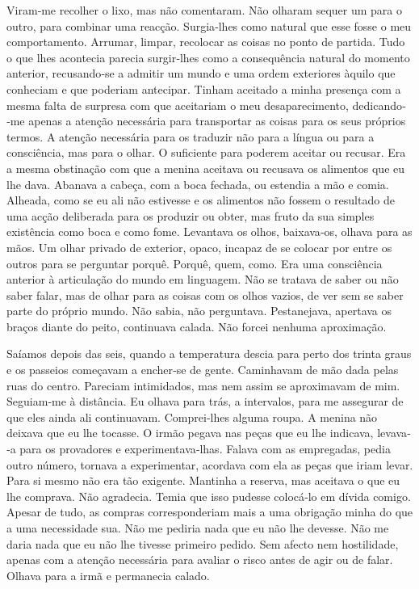 Viram­‑me recolher o lixo, mas não comentaram. Não olharam sequer um
para o outro, para combinar uma reacção. Surgia­‑lhes como natural que
esse fosse o meu comportamento. Arrumar, limpar, recolocar as coisas no
ponto de partida. Tudo o que lhes acontecia parecia surgir­‑lhes como a
consequência natural do momento anterior, recusando­‑se a admitir um
mundo e uma ordem exteriores àquilo que conheciam e que poderiam
antecipar. Tinham aceitado a minha presença com a mesma falta de
surpresa com que aceitariam o meu desaparecimento, dedicando­‑me apenas
a atenção necessária para transportar as coisas para os seus próprios
termos. A atenção necessária para os traduzir não para a língua ou para
a consciência, mas para o olhar. O suficiente para poderem aceitar ou
recusar. Era a mesma obstinação com que a menina aceitava ou recusava os
alimentos que eu lhe dava. Abanava a cabeça, com a boca fechada, ou
estendia a mão e comia. Alheada, como se eu ali não estivesse e os
alimentos não fossem o resultado de uma acção deliberada para os
produzir ou obter, mas fruto da sua simples existência como boca e como
fome. Levantava os olhos, baixava­‑os, olhava para as mãos. Um olhar
privado de exterior, opaco, incapaz de se colocar por entre os outros
para se perguntar porquê. Porquê, quem, como. Era uma consciência
anterior à articulação do mundo em linguagem. Não se tratava de saber ou
não saber falar, mas de olhar para as coisas com os olhos vazios, de ver
sem se saber parte do próprio mundo. Não sabia, não perguntava.
Pestanejava, apertava os braços diante do peito, continuava calada. Não
forcei nenhuma aproximação.

Saíamos depois das seis, quando a temperatura descia para perto dos
trinta graus e os passeios começavam a encher­‑se de gente. Caminhavam
de mão dada pelas ruas do centro. Pareciam intimidados, mas nem assim se
aproximavam de mim. Seguiam­‑me à distância. Eu olhava para trás, a
intervalos, para me assegurar de que eles ainda ali continuavam.
Comprei­‑lhes alguma roupa. A menina não deixava que eu lhe tocasse. O
irmão pegava nas peças que eu lhe indicava, levava­‑a para os provadores
e experimentava­‑lhas. Falava com as empregadas, pedia outro número,
tornava a experimentar, acordava com ela as peças que iriam levar. Para
si mesmo não era tão exigente. Mantinha a reserva, mas aceitava o que eu
lhe comprava. Não agradecia. Temia que isso pudesse colocá­‑lo em dívida
comigo. Apesar de tudo, as compras corresponderiam mais a uma obrigação
minha do que a uma necessidade sua. Não me pediria nada que eu não lhe
devesse. Não me daria nada que eu não lhe tivesse primeiro pedido. Sem
afecto nem hostilidade, apenas com a atenção necessária para avaliar o
risco antes de agir ou de falar. Olhava para a irmã e permanecia calado.


